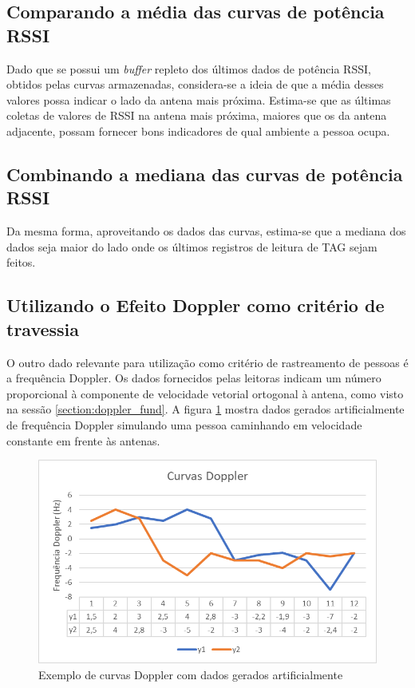 \subsection{Comparando a média das curvas de potência RSSI} \label{section:mean_met}

 Dado que se possui um \textit{buffer} repleto dos últimos dados de potência RSSI, obtidos pelas curvas armazenadas, considera-se a ideia de que a média desses valores possa indicar o lado da antena mais próxima. Estima-se que as últimas coletas de valores de RSSI na antena mais próxima, maiores que os da antena adjacente, possam fornecer bons indicadores de qual ambiente a pessoa ocupa.



\subsection{Combinando a mediana das curvas de potência RSSI} \label{section:median_met}
 
 Da mesma forma, aproveitando os dados das curvas, estima-se que a mediana dos dados seja maior do lado onde os últimos registros de leitura de TAG sejam feitos.

 

 \subsection{Utilizando o Efeito Doppler como critério de travessia} \label{section:doppler_met}
 
  O outro dado relevante para utilização como critério de rastreamento de pessoas é a frequência Doppler. Os dados fornecidos pelas leitoras indicam um número proporcional à componente de velocidade vetorial ortogonal à antena, como visto na sessão \ref{section:doppler_fund}. A figura \ref{fig:doppler_MET} mostra dados gerados artificialmente de frequência Doppler simulando uma pessoa caminhando em velocidade constante em frente às antenas.
 
   \begin{figure}[H]
    \centering
    \includegraphics[width=0.8\linewidth]{figs/Metodologia/image003.png}
    \caption{Exemplo de curvas Doppler com dados gerados artificialmente}
    \label{fig:doppler_MET}
\end{figure}

